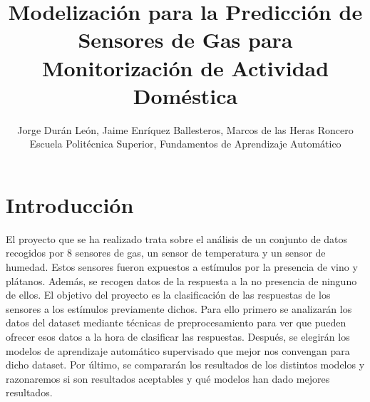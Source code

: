 \documentclass{esannV2}
\begin{document}
\title{Modelización para la Predicción de Sensores de Gas para Monitorización de Actividad Doméstica}

\author{Jorge Durán León, Jaime Enríquez Ballesteros, Marcos de las Heras Roncero
%
%
\vspace{.3cm}\\
%
  Escuela Politécnica Superior, Fundamentos de Aprendizaje Automático \\
%
}

\maketitle


\section{Introducción}

El proyecto que se ha realizado trata sobre el análisis de un conjunto de datos recogidos por 8 sensores de gas, un sensor de temperatura y un sensor de humedad. Estos sensores fueron expuestos a estímulos por la presencia de vino y plátanos. Además, se recogen datos de la respuesta a la no presencia de ninguno de ellos. El objetivo del proyecto es la clasificación de las respuestas de los sensores a los estímulos previamente dichos. Para ello primero se analizarán los datos del dataset mediante técnicas de preprocesamiento para ver que pueden ofrecer esos datos a la hora de clasificar las respuestas. Después, se elegirán los modelos de aprendizaje automático supervisado que mejor nos convengan para dicho dataset. Por último, se compararán los resultados de los distintos modelos y razonaremos si son resultados aceptables y qué modelos han dado mejores resultados.
\end{document}

